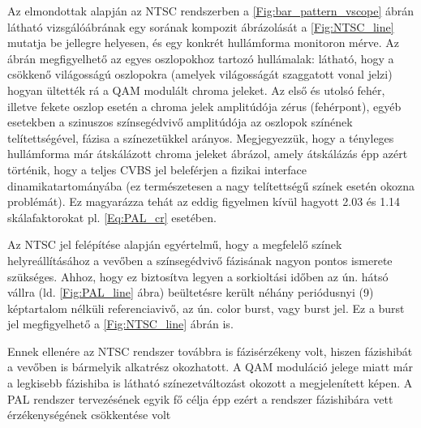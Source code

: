 Az elmondottak alapján az NTSC rendszerben a \ref{Fig:bar_pattern_vscope} ábrán látható vizsgálóábrának egy sorának kompozit ábrázolását a \ref{Fig:NTSC_line} mutatja be jellegre helyesen, és egy konkrét hullámforma monitoron mérve.
Az ábrán megfigyelhető az egyes oszlopokhoz tartozó hullámalak: látható, hogy a csökkenő világosságú oszlopokra (amelyek világosságát szaggatott vonal jelzi) hogyan ültették rá a QAM modulált chroma jeleket.
Az első és utolsó fehér, illetve fekete oszlop esetén a chroma jelek amplitúdója zérus (fehérpont), egyéb esetekben a szinuszos színsegédvivő amplitúdója az oszlopok színének telítettségével, fázisa a színezetükkel arányos.
Megjegyezzük, hogy a tényleges hullámforma már átskálázott chroma jeleket ábrázol, amely átskálázás épp azért történik, hogy a teljes CVBS jel beleférjen a fizikai interface dinamikatartományába (ez természetesen a nagy telítettségű színek esetén okozna problémát).
Ez magyarázza tehát az eddig figyelmen kívül hagyott 2.03 és 1.14 skálafaktorokat pl. \eqref{Eq:PAL_cr} esetében.


Az NTSC jel felépítése alapján egyértelmű, hogy a megfelelő színek helyreállításához a vevőben a színsegédvivő fázisának nagyon pontos ismerete szükséges.
Ahhoz, hogy ez biztosítva legyen a sorkioltási időben az ún. hátsó vállra (ld. \ref{Fig:PAL_line} ábra) beültetésre került néhány periódusnyi (9) képtartalom nélküli referenciavivő, az ún. color burst, vagy burst jel.
Ez a burst jel megfigyelhető a \ref{Fig:NTSC_line} ábrán is.

Ennek ellenére az NTSC rendszer továbbra is fázisérzékeny volt, hiszen fázishibát a vevőben is bármelyik alkatrész okozhatott.
A QAM moduláció jelege miatt már a legkisebb fázishiba is látható színezetváltozást okozott a megjelenített képen.
A PAL rendszer tervezésének egyik fő célja épp ezért a rendszer fázishibára vett érzékenységének csökkentése volt

